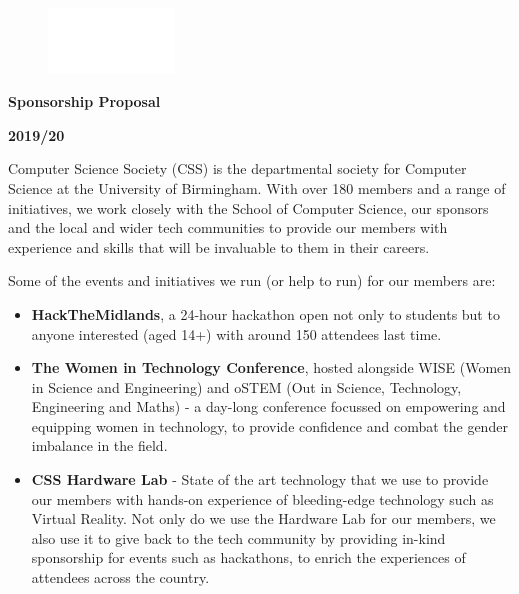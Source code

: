 \documentclass{article}
\begin{document}
\begin{figure}
    \vspace*{-1cm}
    \centering
    \includegraphics[width=0.3\textwidth]{CSS_Logo}
\end{figure}

\vspace*{1cm}

\Huge

\noindent \hspace{0.5cm}\textbf{Sponsorship Proposal}

\par

\noindent \hspace{0.5cm}\textbf{2019/20}

\vspace{1.5cm}

\fontsize{11}{14}\selectfont

Computer Science Society (CSS) is the departmental society for Computer
Science at the University of Birmingham. With over 180 members and a
range of initiatives, we work closely with the School of Computer
Science, our sponsors and the local and wider tech communities to
provide our members with experience and skills that will be invaluable
to them in their careers.\medskip

\noindent Some of the events and initiatives we run (or help to run) for our
members are:\medskip

\begin{itemize}
\item
  \textbf{HackTheMidlands}, a 24-hour hackathon open not only to
  students but to anyone interested (aged 14+) with around 150 attendees
  last time.
\item
  \textbf{The Women in Technology Conference}, hosted alongside WISE
  (Women in Science and Engineering) and oSTEM (Out in Science,
  Technology, Engineering and Maths) - a day-long conference focussed on
  empowering and equipping women in technology, to provide confidence
  and combat the gender imbalance in the field.
\item
  \textbf{CSS Hardware Lab} - State of the art technology that we use to
  provide our members with hands-on experience of bleeding-edge
  technology such as Virtual Reality. Not only do we use the Hardware
  Lab for our members, we also use it to give back to the tech community
  by providing in-kind sponsorship for events such as hackathons, to
  enrich the experiences of attendees across the country.\medskip
\end{itemize}
\end{document}
